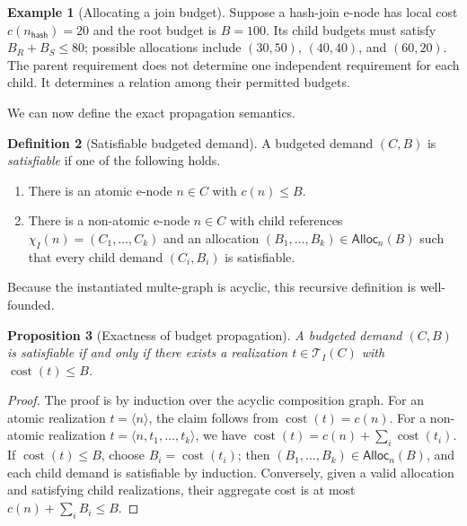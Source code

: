 \documentclass[sigconf,nonacm]{acmart}
\theoremstyle{definition}
\newtheorem{definition}{Definition}[section]
\newtheorem{example}[definition]{Example}
\theoremstyle{plain}
\newtheorem{proposition}[definition]{Proposition}
\theoremstyle{remark}
\begin{document}
\begin{example}[Allocating a join budget]
Suppose a hash-join e-node has local cost
\(c(n_{\mathsf{hash}})=20\) and the root budget is \(B=100\).  Its
child budgets must satisfy \(B_R+B_S\leq 80\); possible allocations
include \((30,50)\), \((40,40)\), and \((60,20)\).  The parent
requirement does not determine one independent requirement for each
child.  It determines a relation among their permitted budgets.
\end{example}

We can now define the exact propagation semantics.

\begin{definition}[Satisfiable budgeted demand]
A budgeted demand \((C,B)\) is \emph{satisfiable} if one of the
following holds.

\begin{enumerate}

\item
There is an atomic e-node \(n\in C\) with \(c(n)\leq B\).

\item
There is a non-atomic e-node \(n\in C\) with child references
\(\chi_I(n)=(C_1,\ldots,C_k)\) and an allocation
\((B_1,\ldots,B_k)\in\mathsf{Alloc}_n(B)\) such that every child
demand \((C_i,B_i)\) is satisfiable.

\end{enumerate}
\end{definition}

Because the instantiated multe-graph is acyclic, this recursive
definition is well-founded.

\begin{proposition}[Exactness of budget propagation]
A budgeted demand \((C,B)\) is satisfiable if and only if there
exists a realization \(t\in\mathcal T_I(C)\) with
\(\operatorname{cost}(t)\leq B\).
\end{proposition}

\begin{proof}
The proof is by induction over the acyclic composition graph.  For
an atomic realization \(t=\langle n\rangle\), the claim follows from
\(\operatorname{cost}(t)=c(n)\).  For a non-atomic realization
\(t=\langle n,t_1,\ldots,t_k\rangle\), we have
\(\operatorname{cost}(t)=c(n)+\sum_{i}\operatorname{cost}(t_i)\).
If \(\operatorname{cost}(t)\leq B\), choose
\(B_i=\operatorname{cost}(t_i)\); then
\((B_1,\ldots,B_k)\in\mathsf{Alloc}_n(B)\), and each child demand is
satisfiable by induction.  Conversely, given a valid allocation and
satisfying child realizations, their aggregate cost is at most
\(c(n)+\sum_{i}B_i\leq B\).
\end{proof}
\end{document}
